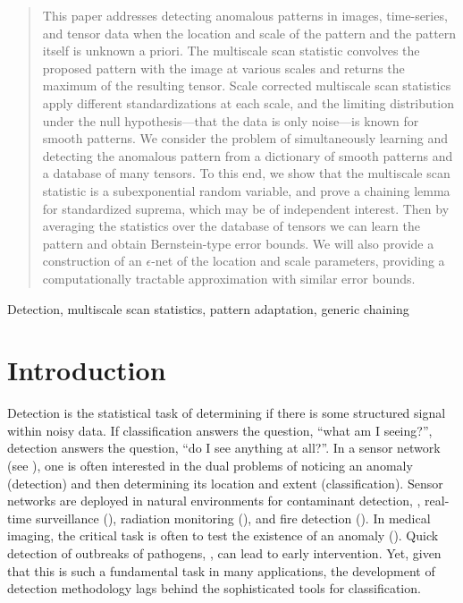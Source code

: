 
\begin{abstract}
This paper addresses detecting anomalous patterns in images, time-series, and tensor data when the location and scale of the pattern and the pattern itself is unknown a priori.
The multiscale scan statistic convolves the proposed pattern with the image at various scales and returns the maximum of the resulting tensor.
Scale corrected multiscale scan statistics apply different standardizations at each scale, and the limiting distribution under the null hypothesis---that the data is only noise---is known for smooth patterns. 
We consider the problem of simultaneously learning and detecting the anomalous pattern from a dictionary of smooth patterns and a database of many tensors.
To this end, we show that the multiscale scan statistic is a subexponential random variable, and prove a chaining lemma for standardized suprema, which may be of independent interest.
Then by averaging the statistics over the database of tensors we can learn the pattern and obtain Bernstein-type error bounds.
We will also provide a construction of an $\epsilon$-net of the location and scale parameters, providing a computationally tractable approximation with similar error bounds.
\end{abstract}

\begin{keywords}
Detection, multiscale scan statistics, pattern adaptation, generic chaining
\end{keywords}

\section{Introduction}

Detection is the statistical task of determining if there is some structured signal within noisy data.
If classification answers the question, ``what am I seeing?'', detection answers the question, ``do I see anything at all?''.
In a sensor network (see \cite{culler2004overview}), one is often interested in the dual problems of noticing an anomaly (detection) and then determining its location and extent (classification).
Sensor networks are deployed in natural environments for contaminant detection, \cite{yang2009real, white2008contaminant}, real-time surveillance (\cite{caron2002method}), radiation monitoring (\cite{brennan2004radiation}), and fire detection (\cite{pozo1997fire}).  In medical imaging, the critical task is often to test the existence of an anomaly (\cite{moon2002brain, james2001breast}).
Quick detection of outbreaks of pathogens, \cite{heffernan2004ssp,rotz2004advances}, can lead to early intervention.
Yet, given that this is such a fundamental task in many applications, the development of detection methodology lags behind the sophisticated tools for classification.

